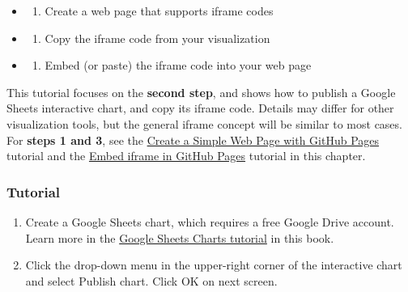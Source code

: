 \documentclass[
  english,
]{book}
\providecommand{\tightlist}{%
  \setlength{\itemsep}{0pt}\setlength{\parskip}{0pt}}
\begin{document}
\begin{itemize}
\item
  \begin{enumerate}
  \def\labelenumi{\arabic{enumi})}
  \tightlist
  \item
    Create a web page that supports iframe codes
  \end{enumerate}
\item
  \begin{enumerate}
  \def\labelenumi{\arabic{enumi})}
  \setcounter{enumi}{1}
  \tightlist
  \item
    Copy the iframe code from your visualization
  \end{enumerate}
\item
  \begin{enumerate}
  \def\labelenumi{\arabic{enumi})}
  \setcounter{enumi}{2}
  \tightlist
  \item
    Embed (or paste) the iframe code into your web page
  \end{enumerate}
\end{itemize}

This tutorial focuses on the \textbf{second step}, and shows how to publish a Google Sheets interactive chart, and copy its iframe code. Details may differ for other visualization tools, but the general iframe concept will be similar to most cases. For \textbf{steps 1 and 3}, see the \href{github-pages}{Create a Simple Web Page with GitHub Pages} tutorial and the \href{iframe-github/}{Embed iframe in GitHub Pages} tutorial in this chapter.

\hypertarget{tutorial-1}{%
\subsubsection*{Tutorial}\label{tutorial-1}}

\begin{enumerate}
\def\labelenumi{\arabic{enumi})}
\item
  Create a Google Sheets chart, which requires a free Google Drive account. Learn more in the \href{charts-google-sheets}{Google Sheets Charts tutorial} in this book.
\item
  Click the drop-down menu in the upper-right corner of the interactive chart and select Publish chart. Click OK on next screen.
\end{enumerate}
\end{document}
